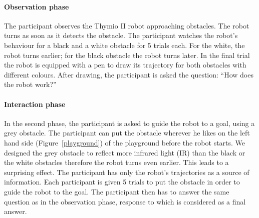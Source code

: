 \documentclass{sig-alternate}
\begin{document}
\paragraph{Observation phase} The participant observes the Thymio II robot
approaching obstacles. The robot turns as soon as it detects the
obstacle. The participant watches the robot's behaviour for a black and a
white obstacle for 5 trials each. For the white, the robot turns
earlier; for the black obstacle the robot turns later. In the final
trial the robot is equipped with a pen to draw its trajectory for both
obstacles with different colours. After drawing, the participant is asked
the question: ``How does the robot work?''

\paragraph{Interaction phase} In the second phase, the participant is asked
to guide the robot to a goal, using a grey obstacle. The participant can put the
obstacle wherever he likes on the left hand side (Figure~\ref{playground}) of
the playground before the robot starts. We designed the grey obstacle to reflect
more infrared light (IR) than the black or the white obstacles therefore the
robot turns even earlier. This leads to a surprising effect. The participant has
only the robot's trajectories as a source of information. Each participant is
given 5 trials to put the obstacle in order to guide the robot to the goal. The
participant then has to answer the same question as in the observation phase,
response to which is considered as a final answer.
\end{document}
